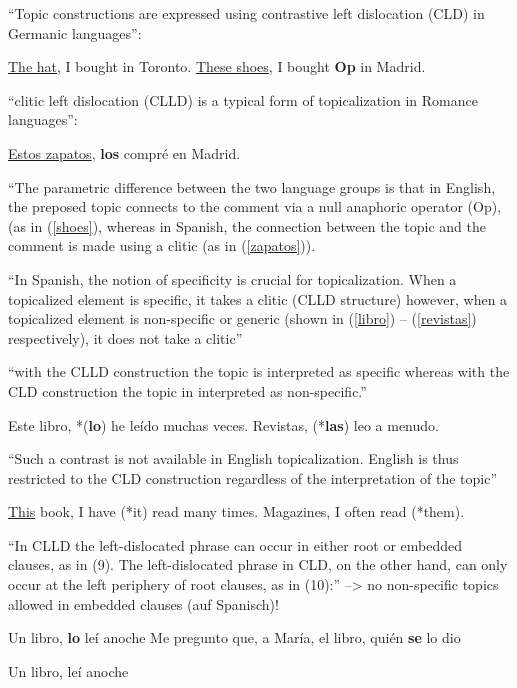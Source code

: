 ``Topic constructions are expressed using contrastive left dislocation (CLD) in Germanic languages'':
\begin{exe}
    \ex \uline{The hat}, I bought in Toronto.
    \ex \label{shoes} \uline{These shoes}, I bought \textbf{Op} in Madrid.
\end{exe}

``clitic left dislocation (CLLD) is a typical form of topicalization in Romance languages'':
\begin{exe}
    \ex \label{zapatos} \uline{Estos zapatos}, \textbf{los} compré en Madrid.
\end{exe}

``The parametric difference between the two language groups is that in English,
the preposed topic connects to the comment via a null anaphoric operator (Op),
(as in (\ref{shoes}), whereas in Spanish, the connection between the topic and the comment is made using a clitic (as
in (\ref{zapatos})).

``In Spanish, the notion of specificity is crucial for topicalization. When a topicalized element is
specific, it takes a clitic (CLLD structure) however, when a topicalized element is non-specific or generic
(shown in (\ref{libro}) – (\ref{revistas}) respectively), it does not take a clitic''

``with the CLLD construction the topic is
interpreted as specific whereas with the CLD construction the topic in interpreted as non-specific.''

\begin{exe}
    \ex \label{libro} Este libro, *(\textbf{lo}) he leído muchas veces.
    \ex \label{revistas} Revistas, (*\textbf{las}) leo a menudo.
\end{exe}

``Such a contrast is not available in English topicalization. English is thus restricted to the CLD construction
regardless of the interpretation of the topic''

\begin{exe}
    \ex \uline{This} book, I have (*it) read many times.
    \ex Magazines, I often read (*them).
\end{exe}

``In CLLD the left-dislocated phrase can occur in either root or embedded clauses, as in (9). The left-dislocated phrase in CLD, on the other hand, can only occur at the left periphery of root clauses, as in (10):''
--> no non-specific topics allowed in embedded clauses (auf Spanisch)!
\begin{exe}
    \ex \begin{xlist}
        \ex Un libro, \textbf{lo} leí anoche
        \ex Me pregunto que, a María, el libro, quién \textbf{se} lo dio
        \end{xlist}
    \ex \begin{xlist}
        \ex Un libro, leí anoche
        \end{xlist}
\end{exe}


